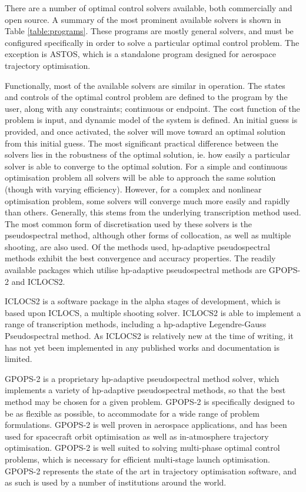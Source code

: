 There are a number of optimal control solvers available, both commercially and open source. A summary of the most prominent available solvers is shown in Table \ref{table:programs}. These programs are mostly general solvers, and must be configured specifically in order to solve a particular optimal control problem. The exception is ASTOS\cite{astos}, which is a standalone program designed for aerospace trajectory optimisation.

Functionally, most of the available solvers are similar in operation. The states and controls of the optimal control problem are defined to the program by the user, along with any constraints; continuous or endpoint. The cost function of the problem is input, and dynamic model of the system is defined. An initial guess is provided, and once activated, the solver will move toward an optimal solution from this initial guess. 
The most significant practical difference between the solvers lies in the robustness of the optimal solution, ie. how easily a particular solver is able to converge to the optimal solution. For a simple and continuous optimisation problem all solvers will be able to approach the same solution (though with varying efficiency). However, for a complex and nonlinear optimisation problem, some solvers will converge much more easily and rapidly than others. Generally, this stems from the underlying transcription method used. 
The most common form of discretisation used by these solvers is the pseudospectral method, although other forms of collocation, as well as multiple shooting, are also used. Of the methods used, \textsf{hp}-adaptive pseudospectral methods exhibit the best convergence and accuracy properties\cite{Chai2015}. The readily available packages which utilise \textsf{hp}-adaptive pseudospectral methods are GPOPS-2\cite{Rao2010} and ICLOCS2\cite{iclocs}.

ICLOCS2 is a software package in the alpha stages of development, which is based upon ICLOCS, a multiple shooting solver\cite{iclocs}. ICLOCS2 is able to implement a range of transcription methods, including a \textsf{hp}-adaptive Legendre-Gauss Pseudospectral method\cite{iclocs}. As ICLOCS2 is relatively new at the time of writing, it has not yet been implemented in any published works and documentation is limited. 

GPOPS-2 is a proprietary \textsf{hp}-adaptive pseudospectral method solver, which implements a variety of \textsf{hp}-adaptive pseudospectral methods, so that the best method may be chosen for a given problem\cite{Rao2010}. GPOPS-2 is specifically designed to be as flexible as possible, to accommodate for a wide range of problem formulations\cite{Rao2010}. GPOPS-2 is well proven in aerospace applications, and has been used for spacecraft orbit optimisation as well as in-atmosphere trajectory optimisation\cite{Rizvi2015,Lipp2014}. GPOPS-2 is well suited to solving multi-phase optimal control problems, which is necessary for efficient multi-stage launch optimisation\cite{Rao2010}. GPOPS-2 represents the state of the art in trajectory optimisation software, and as such is used by a number of institutions around the world. 

